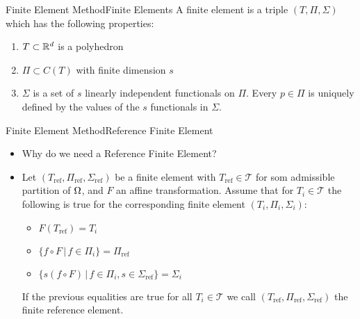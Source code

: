 \begin{frame}{Finite Element Method}{Finite Elements}
        A finite element is a triple $(T, \Pi,\Sigma)$ which has the following properties:
        \label{def:finite_element}
        \begin{enumerate}
            \item $T\subset \mathbb{R}^d$ is a polyhedron
            \item $\Pi \subset C(T)$ with finite dimension $s$
            \item $\Sigma$ is a set of $s$ linearly independent functionals on $\Pi$. 
            Every $p\in \Pi$ is uniquely defined by the values of the $s$ functionals in $\Sigma$.
        \end{enumerate}
\end{frame}

\begin{frame}{Finite Element Method}{Reference Finite Element}
    \begin{itemize}
        \item Why do we need a Reference Finite Element?
        \item 
            Let $(T_{\text{ref}}, \Pi_{\text{ref}},\Sigma_{\text{ref}})$ be a finite element 
        with $T_{\text{ref}}\in \mathcal{T}$ for som admissible partition of 
        $\Omega$, and 
        $F$ an affine transformation. 
        Assume that for $T_i\in\mathcal{T}$ the following 
        is true for the corresponding finite element $(T_i, \Pi_i,\Sigma_i)$:
        \begin{itemize}
            \item $F(T_{\text{ref}}) = T_i$
            \item $\{ f\circ F \,|\,  f \in \Pi_i \} =\Pi_{\text{ref}}  $
            \item $\{ s(f\circ F) \,|\, f \in \Pi_i, s \in \Sigma_{\text{ref}} \} = \Sigma_i$
        \end{itemize}
        If the previous equalities are true for all $T_i\in \mathcal{T}$ we call 
        $(T_{\text{ref}}, \Pi_{\text{ref}},\Sigma_{\text{ref}})$ the finite reference 
        element.
    \end{itemize}
\end{frame}